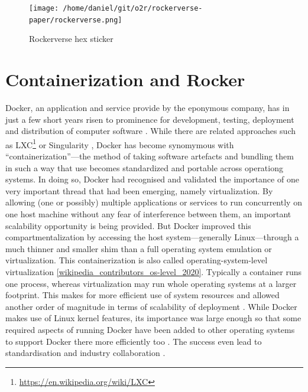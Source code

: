 \begin{figure}
\centering
\texttt{[image: /home/daniel/git/o2r/rockerverse-paper/rockerverse.png]}
\caption{Rockerverse hex sticker}
\end{figure}

\hypertarget{containerization-and-rocker}{%
\section{Containerization and
Rocker}\label{containerization-and-rocker}}

Docker, an application and service provide by the eponymous company, has
in just a few short years risen to prominence for development, testing,
deployment and distribution of computer software
\citep[cf.][]{datadog_8_2018,munoz_history_2019}. While there are
related approaches such as
LXC\footnote{\href{https://en.wikipedia.org/wiki/LXC}{https://en.wikipedia.org/wiki/LXC}}
or Singularity \citep{kurtzer_singularity_2017}, Docker has become
synomymous with ``containerization''---the method of taking software
artefacts and bundling them in such a way that use becomes standardized
and portable across operationg systems. In doing so, Docker had
recognised and validated the importance of one very important thread
that had been emerging, namely virtualization. By allowing (one or
possibly) multiple applications or services to run concurrently on one
host machine without any fear of interference between them, an important
scalability opportunity is being provided. But Docker improved this
compartmentalization by accessing the host system---generally
Linux---through a much thinner and smaller shim than a full operating
system emulation or virtualization. This containerization is also called
operating-system-level virtualization
\ref{wikipedia_contributors_os-level_2020}. Typically a container runs
one process, whereas virtualization may run whole operating systems at a
larger footprint. This makes for more efficient use of system resources
\citep{felter_updated_2015} and allowed another order of magnitude in
terms of scalability of deployment \citep[cf.][]{datadog_8_2018}. While
Docker makes use of Linux kernel features, its importance was large
enough so that some required aspects of running Docker have been added
to other operating systems to support Docker there more efficiently too
\citep{microsoft_linux_2019}. The success even lead to standardisation
and industry collaboration \citep{oci_open_2019}.

